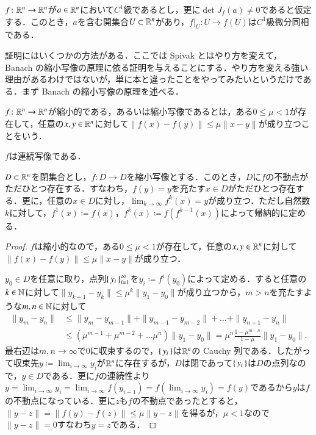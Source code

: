 \begin{thm}[逆関数定理]\label{逆関数定理}
$f \colon \mathbb{R}^n \to \mathbb{R}^n$が$a \in \mathbb{R}^n$において$C^1$級であるとし，更に$\det J_f(a) \neq 0$であると仮定する．このとき，$a$を含む開集合$U \subset \mathbb{R}^n$があり，$f|_U \colon U \to f(U)$は$C^1$級微分同相である．
\end{thm}

証明にはいくつかの方法がある．ここでは Spivak とはやり方を変えて， Banach の縮小写像の原理に依る証明を与えることにする．やり方を変える強い理由があるわけではないが，単に本と違ったことをやってみたいというだけである．まず Banach の縮小写像の原理を述べる．

\begin{defi}[縮小写像]
$f \colon \mathbb{R}^n \to \mathbb{R}^n$が縮小的である，あるいは縮小写像であるとは，ある$0 \leq \mu < 1$が存在して，任意の$x, y \in \mathbb{R}^n$に対して$\|f(x) - f(y)\| \leq \mu \|x-y\|$が成り立つことをいう．
\end{defi}

\begin{que}
$f$は連続写像である．
\end{que}

\begin{thm}
$D \subset \mathbb{R}^n$を閉集合とし，$f \colon D \to D$を縮小写像とする．このとき，$D$に$f$の不動点がただひとつ存在する．すなわち，$f(y)=y$を充たす$x \in D$がただひとつ存在する．更に，任意の$x \in D$に対し，$\lim_{k \to \infty} f^k(x)=y$が成り立つ．ただし自然数$k$に対して，$f^1(x) \coloneqq f(x)$，$f^k(x) \coloneqq f(f^{k-1}(x))$によって帰納的に定める．
\end{thm}

\begin{proof}
$f$は縮小的なので，ある$0 \leq \mu < 1$が存在して，任意の$x, y \in \mathbb{R}^n$に対して$\|f(x) - f(y)\| \leq \mu \|x-y\|$が成り立つ．

$y_0 \in D$を任意に取り，点列$\set{y_i}_{i=1}^\infty$を$y_i \coloneqq f^{i}(y_0)$によって定める．すると任意の$k \in \mathbb{N}$に対して$\|y_{k+1} - y_k\| \leq \mu^k\|y_1 - y_0\|$が成り立つから，$m>n$を充たすような$m,n \in \mathbb{N}$に対して
\begin{align}
\|y_m - y_n\| &\leq \|y_m - y_{m-1}\| + \|y_{m-1} - y_{m-2}\| + \dots + \|y_{n+1} - y_{n}\| \\
& \leq (\mu^{m-1} + \mu^{m-2} + \dots \mu^{n})  \|y_1 - y_0\| = \mu^{n} \frac{1 - \mu^{m-n}}{1 - \mu}\|y_1 - y_0\|.
\end{align}最右辺は$m,n \to \infty$で0に収束するので，$\set{y_i}$は$\mathbb{R}^n$の Cauchy 列である．したがって収束先$y \coloneqq \lim_{i \to \infty} y_i$が$\mathbb{R}^n$に存在するが，$D$は閉であって$\set{y_i}$は$D$の点列なので，$y \in D$である．更に$f$の連続性より$y = \lim_{i \to \infty} y_i = \lim_{i \to \infty} f(y_{i-1}) = f(\lim_{i \to \infty} y_i) = f(y)$であるから$y$は$f$の不動点になっている．更に$z$も$f$の不動点であったとすると，$\|y - z\| = \|f(y) - f(z)\| \leq \mu \|y-z\|$を得るが，$\mu < 1$なので$\|y-z\|=0$すなわち$y=z$である．
\end{proof}

